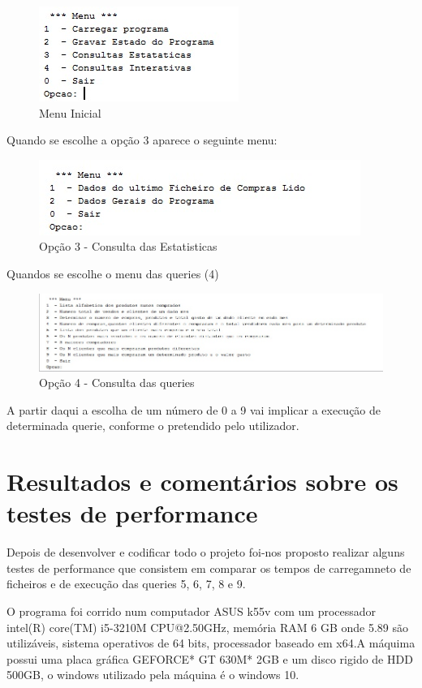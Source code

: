 	
\begin{figure}[h!]
	\includegraphics[scale=1.5]{MenuInicial.jpg}  
	\caption{Menu Inicial }  
\end{figure}

Quando se escolhe a opção 3 aparece o seguinte menu: 
\begin{figure}[h!]
	\includegraphics[scale=1]{ConsultasEstatisticas.jpg}  
	\caption{Opção 3 - Consulta das Estatisticas }  
\end{figure}

Quandos se escolhe o menu das queries (4) 
\begin{figure}[h!]
	\includegraphics[scale=0.9]{ConsultasIterativas}  
	\caption{Opção 4 - Consulta das queries }  
\end{figure}

A partir daqui a escolha de um número de 0 a 9 vai implicar a execução de determinada querie, conforme o pretendido pelo utilizador. 

\chapter{Resultados e comentários sobre os testes de performance}

Depois de desenvolver e codificar todo o projeto foi-nos proposto realizar alguns testes de performance que consistem em comparar os tempos de carregamneto de ficheiros e de execução das queries 5, 6, 7, 8 e 9.

O programa foi corrido num computador ASUS k55v com um processador intel(R) core(TM) i5-3210M CPU@2.50GHz, memória RAM 6 GB onde 5.89 são utilizáveis, sistema operativos de 64 bits, processador baseado em x64.A máquima possui uma placa gráfica GEFORCE* GT 630M* 2GB e um disco rigido de HDD 500GB, o windows utilizado pela máquina é o windows 10. 

